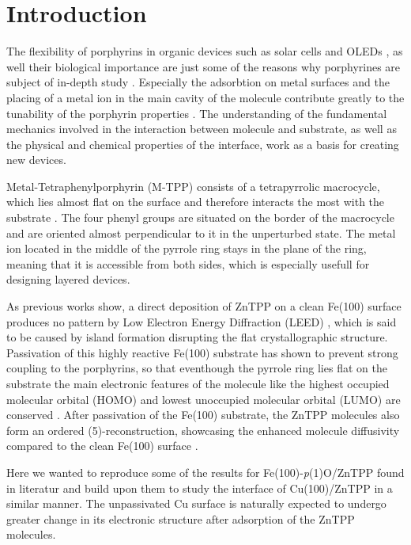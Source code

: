 \chapter{Introduction}
The flexibility of porphyrins in organic devices such as solar cells \cite*{schmidt-mende_zn-porphyrin-sensitized_2005} and OLEDs \cite*{graham_extended_2011}, as well their biological importance \cite*{dolphin_biochemical_1974} are just some of the reasons why porphyrines are subject of in-depth study \cite*{gottfried_surface_2015}.
Especially the adsorbtion on metal surfaces and the placing of a metal ion in the main cavity of the molecule contribute greatly to the tunability of the porphyrin properties \cite*{calloni_electron_2014}.
The understanding of the fundamental mechanics involved in the interaction between molecule and substrate, as well as the physical and chemical properties of the interface, work as a basis for creating new devices.

Metal-Tetraphenylporphyrin (M-TPP) consists of a tetrapyrrolic macrocycle, which lies almost flat on the surface and therefore interacts the most with the substrate \cite*{picone_local_2018}.
The four phenyl groups are situated on the border of the macrocycle and are oriented almost perpendicular to it in the unperturbed state.
The metal ion located in the middle of the pyrrole ring stays in the plane of the ring, meaning that it is accessible from both sides, which is especially usefull for designing layered devices.

As previous works show, a direct deposition of ZnTPP on a clean Fe(100) surface produces no pattern by Low Electron Energy Diffraction (LEED) \cite*{bussetti_structure_2016}, which is said to be caused by island formation disrupting the flat crystallographic structure.
Passivation of this highly reactive Fe(100) substrate has shown to prevent strong coupling to the porphyrins, so that eventhough the pyrrole ring lies flat on the substrate the main electronic features of the molecule like the highest occupied molecular orbital (HOMO) and lowest unoccupied molecular orbital (LUMO) are conserved \cite*{picone_local_2018}.
After passivation of the Fe(100) substrate, the ZnTPP molecules also form an ordered (5)-reconstruction, showcasing the enhanced molecule diffusivity compared to the clean Fe(100) surface \cite*{bussetti_structure_2016}.

Here we wanted to reproduce some of the results for Fe(100)-\textit{p}(1)O/ZnTPP found in literatur \cite*{bussetti_filled_2016} \cite*{janas_enhancing_2022} and build upon them to study the interface of Cu(100)/ZnTPP in a similar manner.
The unpassivated Cu surface is naturally expected to undergo greater change in its electronic structure after adsorption of the ZnTPP molecules.